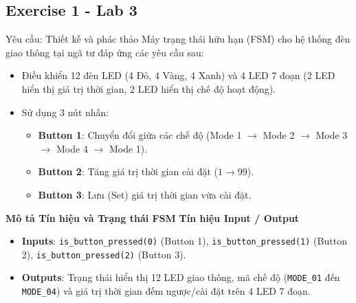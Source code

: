 \subsection{Exercise 1 - Lab 3}

Yêu cầu: Thiết kế và phác thảo Máy trạng thái hữu hạn (FSM) cho hệ thống đèn giao thông tại ngã tư đáp ứng các yêu cầu sau:
\begin{itemize}
    \item Điều khiển 12 đèn LED (4 Đỏ, 4 Vàng, 4 Xanh) và 4 LED 7 đoạn (2 LED hiển thị giá trị thời gian, 2 LED hiển thị chế độ hoạt động).
    \item Sử dụng 3 nút nhấn:
    \begin{itemize}
        \item \textbf{Button 1}: Chuyển đổi giữa các chế độ (Mode 1 $\rightarrow$ Mode 2 $\rightarrow$ Mode 3 $\rightarrow$ Mode 4 $\rightarrow$ Mode 1).
        \item \textbf{Button 2}: Tăng giá trị thời gian cài đặt ($1 \rightarrow 99$).
        \item \textbf{Button 3}: Lưu (Set) giá trị thời gian vừa cài đặt.
    \end{itemize}
\end{itemize}

\textbf{Mô tả Tín hiệu và Trạng thái FSM
}
\textbf{Tín hiệu Input / Output}
\begin{itemize}
    \item \textbf{Inputs}: \texttt{is\_button\_pressed(0)} (Button 1), \texttt{is\_button\_pressed(1)} (Button 2), \texttt{is\_button\_pressed(2)} (Button 3).
    \item \textbf{Outputs}: Trạng thái hiển thị 12 LED giao thông, mã chế độ (\texttt{MODE\_01} đến \texttt{MODE\_04}) và giá trị thời gian đếm ngược/cài đặt trên 4 LED 7 đoạn.
\end{itemize}

